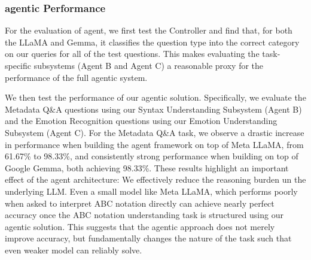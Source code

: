 \documentclass[sigconf]{acmart}
\begin{document}
\begin{table}[h]
\centering
{}
\caption{Comparison of standalone LLM accuracy vs. agentic performance on two ABC-EVAL tasks.}
\label{tab:llm-agent-compare}
\end{table}




\subsubsection{agentic Performance}
For the evaluation of agent, we first test the Controller and find that, for both the LLaMA and Gemma, it classifies the question type into the correct category on our queries for all of the test questions. This makes evaluating the task-specific subsystems (Agent B and Agent C) a reasonable proxy for the performance of the full agentic system.


We then test the performance of our agentic solution. Specifically, we evaluate the Metadata Q\&A questions using our Syntax Understanding Subsystem (Agent B) and the Emotion Recognition questions using our Emotion Understanding Subsystem (Agent C). For the Metadata Q\&A task, we observe a drastic increase in performance when building the agent framework on top of Meta LLaMA, from 61.67\% to 98.33\%, and consistently strong performance when building on top of Google Gemma, both achieving 98.33\%. These results highlight an important effect of the agent architecture: We effectively reduce the reasoning burden un the underlying LLM. Even a small model like Meta LLaMA, which performs poorly when asked to interpret ABC notation directly can achieve nearly perfect accuracy once the ABC notation understanding task is structured using our agentic solution. This suggests that the agentic approach does not merely improve accuracy, but fundamentally changes the nature of the task such that even weaker model can reliably solve.    
 
\end{document}
